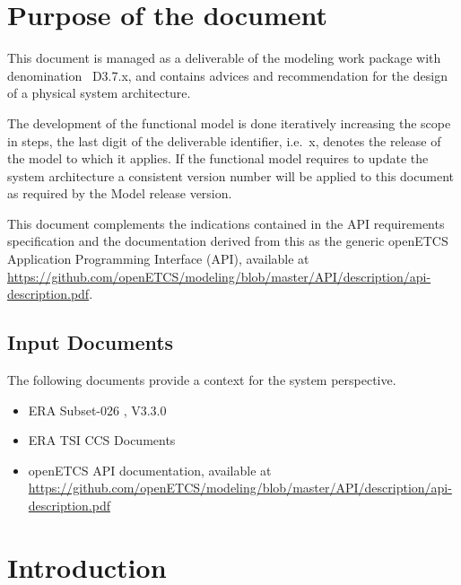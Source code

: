 
\chapter{Purpose of the document}

This document is managed as a deliverable of the modeling work package with denomination ~D3.7.x, and contains advices and recommendation for the design of a physical system architecture.  

The development of the functional model is done iteratively increasing the scope in steps, the last digit of the deliverable identifier, i.e.~x, denotes the release of the model to which it applies. If the functional model requires to update the system architecture a consistent version number will be applied to this document as required by the Model release version.

This document complements the indications contained in the API requirements specification and the documentation derived from this as the generic openETCS Application Programming Interface (API), available at \url{https://github.com/openETCS/modeling/blob/master/API/description/api-description.pdf}. \cite{alstom-api}

\section{Input Documents}

The following documents provide a context for the system perspective.

\begin{itemize}
	\item ERA Subset-026 \cite{subset-026}, V3.3.0
	\item ERA TSI CCS Documents
	\item openETCS API documentation, available at \url{https://github.com/openETCS/modeling/blob/master/API/description/api-description.pdf} \cite{alstom-api}\cite{alstom-api-app-layer}\cite{alstom-api-data-dict}
\end{itemize}




\chapter{Introduction}


